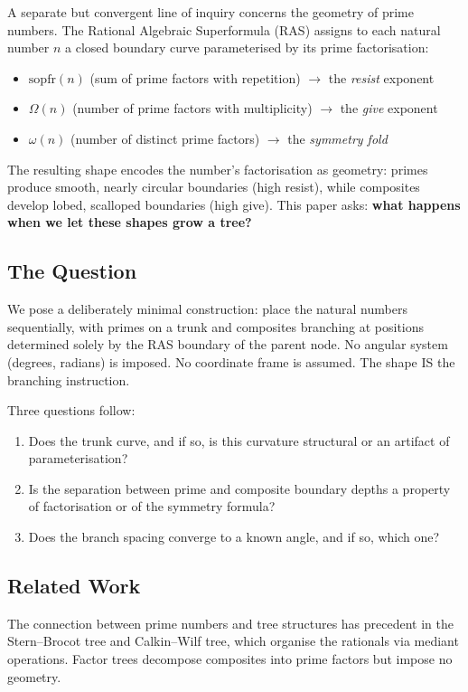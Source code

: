 \documentclass[11pt,a4paper]{article}
\begin{document}
A separate but convergent line of inquiry concerns the geometry of prime numbers. The Rational Algebraic Superformula (RAS) \cite{ras2026} assigns to each natural number $n$ a closed boundary curve parameterised by its prime factorisation:
\begin{itemize}[nosep]
    \item $\mathrm{sopfr}(n)$ (sum of prime factors with repetition) $\to$ the \emph{resist} exponent
    \item $\Omega(n)$ (number of prime factors with multiplicity) $\to$ the \emph{give} exponent
    \item $\omega(n)$ (number of distinct prime factors) $\to$ the \emph{symmetry fold}
\end{itemize}

The resulting shape encodes the number's factorisation as geometry: primes produce smooth, nearly circular boundaries (high resist), while composites develop lobed, scalloped boundaries (high give). This paper asks: \textbf{what happens when we let these shapes grow a tree?}

\subsection{The Question}

We pose a deliberately minimal construction: place the natural numbers sequentially, with primes on a trunk and composites branching at positions determined solely by the RAS boundary of the parent node. No angular system (degrees, radians) is imposed. No coordinate frame is assumed. The shape IS the branching instruction.

Three questions follow:
\begin{enumerate}[nosep]
    \item Does the trunk curve, and if so, is this curvature structural or an artifact of parameterisation?
    \item Is the separation between prime and composite boundary depths a property of factorisation or of the symmetry formula?
    \item Does the branch spacing converge to a known angle, and if so, which one?
\end{enumerate}

\subsection{Related Work}

The connection between prime numbers and tree structures has precedent in the Stern--Brocot tree and Calkin--Wilf tree, which organise the rationals via mediant operations. Factor trees decompose composites into prime factors but impose no geometry.
\end{document}
